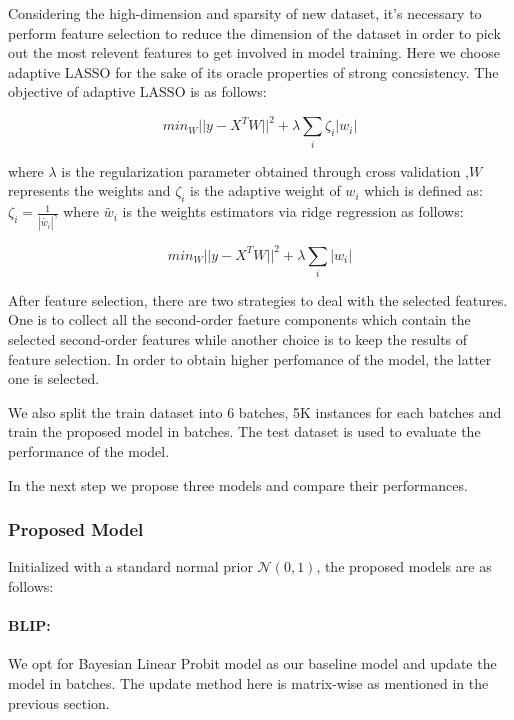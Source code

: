 \documentclass{article}
\begin{document}
Considering the high-dimension and sparsity of new dataset, it's necessary to perform feature selection to reduce the dimension of the dataset in order to pick out the most relevent features to get involved in model training. Here we choose adaptive LASSO for the sake of its oracle properties of strong concsistency. The objective of adaptive LASSO is as follows:

\begin{equation}
  min_W || y - X^T W ||^2 + \lambda \sum_i \zeta_i |w_i| 
\end{equation}

where $\lambda$ is the regularization parameter obtained through cross validation ,$W$ represents the weights and $\zeta_i$ is the adaptive weight of $w_i$ which is defined as: $\zeta_i = \frac{1}{|\tilde{w_i}|^{\gamma}}$ where $\tilde{w_i}$ is the weights estimators via ridge regression as follows:

\begin{equation}
  min_W || y - X^T W ||^2 + \lambda \sum_i  |w_i| 
\end{equation}

After feature selection, there are two strategies to deal with the selected features. One is to collect all the second-order faeture components which contain the selected second-order features while another choice is to keep the results of feature selection. In order to obtain higher perfomance of the model, the latter one is selected. 

We also split the train dataset into 6 batches, 5K instances for each batches and train the proposed model in batches. The test dataset is used to evaluate the performance of the model.

In the next step we propose three models and compare their performances.

\subsubsection{Proposed Model}

Initialized with a standard normal prior $\mathcal{N}(0,1)$, the proposed models are as follows:

\paragraph*{BLIP:}

We opt for Bayesian Linear Probit model as our baseline model and update the model in batches. The update method here is matrix-wise as mentioned in the previous section.
\end{document}

